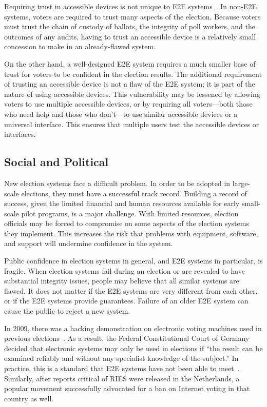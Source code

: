 Requiring trust in accessible devices is not unique to E2E
systems~\cite{runyan2007improving}. In non-E2E systems, voters are
required to trust many aspects of the election. Because voters must
trust the chain of custody of ballots, the integrity of poll workers,
and the outcomes of any audits, having to trust an accessible device
is a relatively small concession to make in an already-flawed system.

On the other hand, a well-designed E2E system requires a much smaller
base of trust for voters to be confident in the election results. The
additional requirement of trusting an accessible device is not a flaw
of the E2E system; it is part of the nature of using accessible
devices. This vulnerability may be lessened by allowing voters to use
multiple accessible devices, or by requiring all voters---both those
who need help and those who don't---to use similar accessible devices
or a universal interface. This ensures that multiple users test the
accessible devices or interfaces.

\subsection{Social and Political}

New election systems face a difficult problem. In order to be adopted
in large-scale elections, they must have a successful track
record. Building a record of success, given the limited financial and
human resources available for early small-scale pilot programs, is a
major challenge. With limited resources, election officials may be
forced to compromise on some aspects of the election systems they
implement. This increases the risk that problems with equipment,
software, and support will undermine confidence in the system.

Public confidence in election systems in general, and E2E systems in
particular, is fragile. When election systems fail during an election
or are revealed to have substantial integrity issues, people may
believe that all similar systems are flawed. It does not matter if the
E2E systems are very different from each other, or if the E2E systems
provide guarantees. Failure of an older E2E system can cause the
public to reject a new system.

In 2009, there was a hacking demonstration on electronic voting
machines used in previous elections~\cite{germany2009decision}. As a
result, the Federal Constitutional Court of Germany decided that
electronic systems may only be used in elections if ``the result can
be examined reliably and without any specialist knowledge of the
subject.'' In practice, this is a standard that E2E systems have not
been able to meet~\cite{byrne2007usability}. Similarly, after reports
critical of RIES were released in the Netherlands, a popular movement
successfully advocated for a ban on Internet voting in that country as
well.

